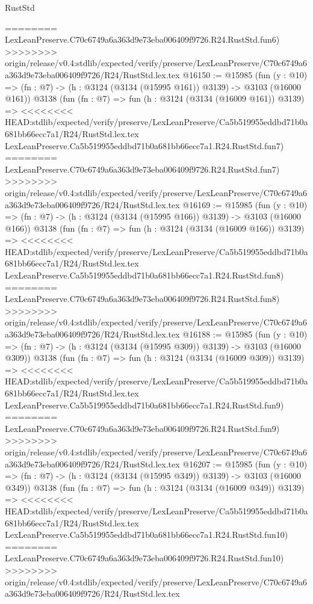 \begin{lexlean}{RustStd}
\begin{coremodule}
{\begin{coremodule}
{{{{{{{{{{{{{{{{{{{{{{{{{{========
    LexLeanPreserve.C70c6749a6a363d9e73eba006409f9726.R24.RustStd.fun6)
>>>>>>>> origin/release/v0.4:stdlib/expected/verify/preserve/LexLeanPreserve/C70c6749a6a363d9e73eba006409f9726/R24/RustStd.lex.tex
@16150 := @15985
    (fun (y : @10) => (fn : @7) -> (h : @3124 (@3134 (@15995 @161)) @3139) -> @3103 (@16000 @161))
    @3138
    (fun (fn : @7) =>
    fun (h : @3124 (@3134 (@16009 @161)) @3139) =>
<<<<<<<< HEAD:stdlib/expected/verify/preserve/LexLeanPreserve/Ca5b519955eddbd71b0a681bb66ecc7a1/R24/RustStd.lex.tex
    LexLeanPreserve.Ca5b519955eddbd71b0a681bb66ecc7a1.R24.RustStd.fun7)
========
    LexLeanPreserve.C70c6749a6a363d9e73eba006409f9726.R24.RustStd.fun7)
>>>>>>>> origin/release/v0.4:stdlib/expected/verify/preserve/LexLeanPreserve/C70c6749a6a363d9e73eba006409f9726/R24/RustStd.lex.tex
@16169 := @15985
    (fun (y : @10) => (fn : @7) -> (h : @3124 (@3134 (@15995 @166)) @3139) -> @3103 (@16000 @166))
    @3138
    (fun (fn : @7) =>
    fun (h : @3124 (@3134 (@16009 @166)) @3139) =>
<<<<<<<< HEAD:stdlib/expected/verify/preserve/LexLeanPreserve/Ca5b519955eddbd71b0a681bb66ecc7a1/R24/RustStd.lex.tex
    LexLeanPreserve.Ca5b519955eddbd71b0a681bb66ecc7a1.R24.RustStd.fun8)
========
    LexLeanPreserve.C70c6749a6a363d9e73eba006409f9726.R24.RustStd.fun8)
>>>>>>>> origin/release/v0.4:stdlib/expected/verify/preserve/LexLeanPreserve/C70c6749a6a363d9e73eba006409f9726/R24/RustStd.lex.tex
@16188 := @15985
    (fun (y : @10) => (fn : @7) -> (h : @3124 (@3134 (@15995 @309)) @3139) -> @3103 (@16000 @309))
    @3138
    (fun (fn : @7) =>
    fun (h : @3124 (@3134 (@16009 @309)) @3139) =>
<<<<<<<< HEAD:stdlib/expected/verify/preserve/LexLeanPreserve/Ca5b519955eddbd71b0a681bb66ecc7a1/R24/RustStd.lex.tex
    LexLeanPreserve.Ca5b519955eddbd71b0a681bb66ecc7a1.R24.RustStd.fun9)
========
    LexLeanPreserve.C70c6749a6a363d9e73eba006409f9726.R24.RustStd.fun9)
>>>>>>>> origin/release/v0.4:stdlib/expected/verify/preserve/LexLeanPreserve/C70c6749a6a363d9e73eba006409f9726/R24/RustStd.lex.tex
@16207 := @15985
    (fun (y : @10) => (fn : @7) -> (h : @3124 (@3134 (@15995 @349)) @3139) -> @3103 (@16000 @349))
    @3138
    (fun (fn : @7) =>
    fun (h : @3124 (@3134 (@16009 @349)) @3139) =>
<<<<<<<< HEAD:stdlib/expected/verify/preserve/LexLeanPreserve/Ca5b519955eddbd71b0a681bb66ecc7a1/R24/RustStd.lex.tex
    LexLeanPreserve.Ca5b519955eddbd71b0a681bb66ecc7a1.R24.RustStd.fun10)
========
    LexLeanPreserve.C70c6749a6a363d9e73eba006409f9726.R24.RustStd.fun10)
>>>>>>>> origin/release/v0.4:stdlib/expected/verify/preserve/LexLeanPreserve/C70c6749a6a363d9e73eba006409f9726/R24/RustStd.lex.tex
}}}}}}}}}}}}}}}}}}}}}}}}}}
\end{coremodule}}
\end{coremodule}
\end{lexlean}
